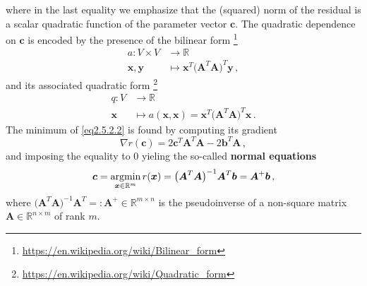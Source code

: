 \documentclass[../main.tex]{subfiles}
\begin{document}
where in the last equality we emphasize that the (squared) norm of the residual is a scalar quadratic function of the parameter vector $\boldsymbol{c}$.
The quadratic dependence on $\boldsymbol{c}$ is encoded by the presence of the bilinear form \footnote{\url{https://en.wikipedia.org/wiki/Bilinear_form}}
\begin{align*}
        a : V\times V &\to \mathbb{R} \nonumber \\
            \boldsymbol{x},\boldsymbol{y} &\mapsto \boldsymbol{x}^{T}\big(\boldsymbol{A}^{T}\boldsymbol{A}\big)^{T}\boldsymbol{y} \,,
\end{align*}
and its associated quadratic form \footnote{\url{https://en.wikipedia.org/wiki/Quadratic_form}}
\begin{align*}
        q : V &\to \mathbb{R} \nonumber \\
        \boldsymbol{x} &\mapsto a(\boldsymbol{x},\boldsymbol{x}) = \boldsymbol{x}^{T}\big(\boldsymbol{A}^{T}\boldsymbol{A}\big)^{T}\boldsymbol{x}\,.
\end{align*}
The minimum of \eqref{eq2.5.2.2} is found by computing its gradient
\begin{equation*}
     \nabla r(\boldsymbol{c}) = 2 \boldsymbol{c}^{T}\boldsymbol{A}^{T}\boldsymbol{A} - 2 \boldsymbol{b}^{T}\boldsymbol{A}\,,
\end{equation*}
and imposing the equality to $0$ yieling the so-called \textbf{normal equations}
\begin{equation}\label{eq2.5.2.3}
        \boldsymbol{c} = \operatorname*{argmin}_{\boldsymbol{x}\in \mathbb{R}^{m}}r(\boldsymbol{x}) = \big(\boldsymbol{A}^{T}\boldsymbol{A}\big)^{-1}\boldsymbol{A}^{T}\boldsymbol{b} = \boldsymbol{A}^{+}\boldsymbol{b} \,,
\end{equation}
where $\big(\boldsymbol{A}^{T}\boldsymbol{A}\big)^{-1}\boldsymbol{A}^{T} =: \boldsymbol{A}^{+}\in \mathbb{R}^{m\times n}$ is the pseudoinverse of a non-square matrix $\boldsymbol{A}\in \mathbb{R}^{n\times m}$ of rank $m$.


\end{document}
